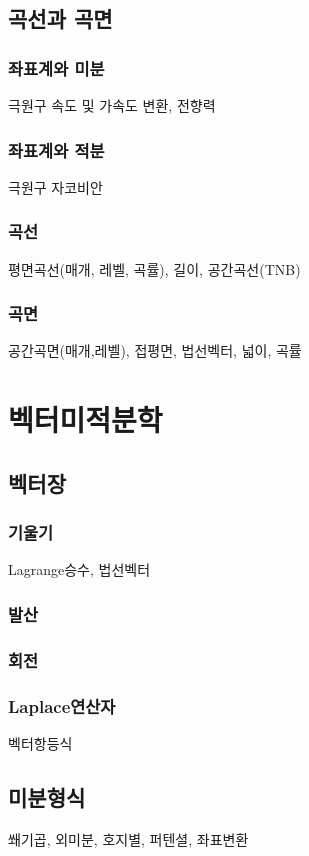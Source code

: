\documentclass{../../large}
\begin{document}
\chapter{곡선과 곡면}

\section{좌표계와 미분}
극원구
속도 및 가속도 변환, 전향력
\section{좌표계와 적분}
극원구
자코비안
\section{곡선}
평면곡선(매개, 레벨, 곡률), 길이, 공간곡선(TNB)
\section{곡면}
공간곡면(매개,레벨), 접평면, 법선벡터, 넓이, 곡률







\part{벡터미적분학}

\chapter{벡터장}
\section{기울기}
Lagrange승수, 법선벡터
\section{발산}
\section{회전}
\section{Laplace연산자}
벡터항등식






\chapter{미분형식}
쐐기곱, 외미분, 호지별, 퍼텐셜, 좌표변환
\end{document}
